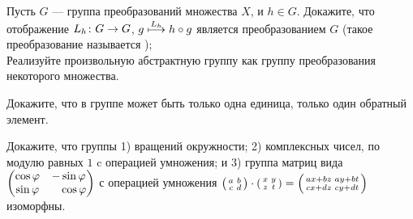 \documentclass[a4paper,12pt]{article}
\begin{document}
Пусть $G$ --- группа преобразований множества $X$, и $h\in G$.
Докажите, что отображение $L_h \colon G \rightarrow G$, $g\stackrel{L_h}{\longmapsto} h\circ g$ является преобразованием $G$ (такое преобразование называется );\\
Реализуйте произвольную абстрактную группу как группу преобразования некоторого множества.


Докажите, что в группе может быть только одна единица, только один обратный элемент.

Докажите, что группы 1) вращений окружности; 2) комплексных чисел, по модулю равных $1$ c операцией умножения; и 3) группа матриц вида $\begin{pmatrix}\cos \varphi & - \sin \varphi\\\sin \varphi &\phantom{-}\cos\varphi\end{pmatrix}$ с операцией умножения $\left(\begin{smallmatrix}a&b\\c&d\end{smallmatrix}\right)\cdot\left(\begin{smallmatrix}x&y\\z&t\end{smallmatrix}\right)=
\left(\begin{smallmatrix}ax+bz&ay+bt\\cx+dz&cy+dt\end{smallmatrix}\right)$ изоморфны.
\end{document}
